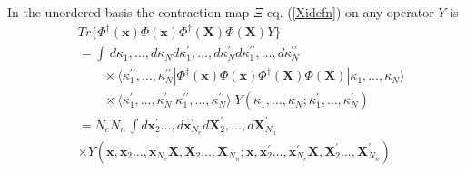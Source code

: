 \documentclass[aps,preprint]{revtex4}%
\begin{document}
In the unordered basis the contraction map $\Xi$ eq. (\ref{Xidefn}) on any
operator $Y$ is
\begin{align}
&  \!\!\!\!\!Tr\{\Phi^{\dagger}(\mathbf{x})\Phi(\mathbf{x})\Phi^{\dagger
}(\mathbf{X})\Phi(\mathbf{X})Y\}\nonumber\\
&  =\int\,d\kappa_{1},\ldots,d\kappa_{N}d\kappa_{1}^{\prime},\ldots
,d\kappa_{N}^{\prime}d\kappa_{1}^{\prime\prime},\ldots,d\kappa_{N}%
^{\prime\prime}\nonumber\\
&  \qquad\times\langle\kappa_{1}^{\prime\prime},\ldots,\kappa_{N}%
^{\prime\prime}|\Phi^{\dagger}(\mathbf{x})\Phi(\mathbf{x})\Phi^{\dagger
}(\mathbf{X})\Phi(\mathbf{X})|\kappa_{1},\ldots,\kappa_{N}\rangle\nonumber\\
&  \qquad\times\langle\kappa_{1}^{\prime},\ldots,\kappa_{N}^{\prime}%
|\kappa_{1}^{\prime\prime},\ldots,\kappa_{N}^{\prime\prime}\rangle
\;Y(\kappa_{1},\ldots,\kappa_{N};\kappa_{1}^{\prime},\ldots,\kappa_{N}%
^{\prime})\nonumber\\
&  =N_{e}N_{n}\,\int d\mathbf{x}_{2}^{\prime}\ldots,d\mathbf{x}_{N_{e}%
}^{\prime}d\mathbf{X}_{2}^{\prime},\ldots,d\mathbf{X}_{N_{n}}^{\prime
}\nonumber\\
&  \times Y(\mathbf{x},\mathbf{x}_{2}\ldots,\mathbf{x}_{N_{e}}\mathbf{X}%
,\mathbf{X}_{2}\ldots,\mathbf{X}_{N_{n}};\mathbf{x},\mathbf{x}_{2}^{\prime
}\ldots,\mathbf{x}_{N_{e}}^{\prime}\mathbf{X},\mathbf{X}_{2}^{\prime}%
\ldots,\mathbf{X}_{N_{n}}^{\prime}) \label{TrphiphiphiphiY}%
\end{align}
\end{document}
